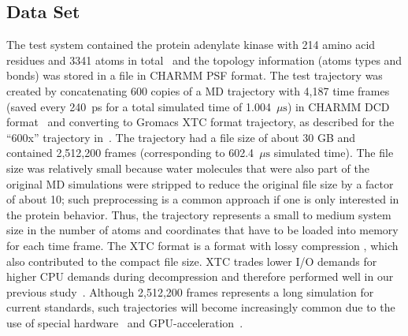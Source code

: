 \subsection{Data Set}
\label{sec:data}

The test system contained the protein adenylate kinase with 214 amino acid residues and 3341 atoms in total~\cite{Seyler:2014il} and the topology information (atoms types and bonds) was stored in a file in CHARMM PSF format.
The test trajectory was created by concatenating 600 copies of a MD trajectory with 4,187 time frames (saved every 240~ps for a total simulated time of 1.004~$\mu\text{s}$) in CHARMM DCD format~\cite{Seyler:2017aa} and converting to Gromacs XTC format trajectory, as described for the ``600x'' trajectory in~\citet{Khoshlessan:2017ab}.
The trajectory had a file size of about 30 GB and contained 2,512,200 frames (corresponding to 602.4~$\mu\text{s}$ simulated time).
The file size was relatively small because water molecules that were also part of the original MD simulations were stripped to reduce the original file size by a factor of about 10; such preprocessing is a common approach if one is only interested in the protein behavior.
Thus, the trajectory represents a small to medium system size in the number of atoms and coordinates that have to be loaded into memory for each time frame.
The XTC format is a format with lossy compression \citep{Lindahl01, Spangberg:2011zr}, which also contributed to the compact file size.
XTC trades lower I/O demands for higher CPU demands during decompression and therefore performed well in our previous study~\citep{Khoshlessan:2017ab}.
Although 2,512,200 frames represents a long simulation for current standards, such trajectories will become increasingly common due to the use of special hardware~\citep{Shaw:2009ly, Shaw:2014aa} and GPU-acceleration~\citep{Salomon-Ferrer:2013cr, Glaser:2015ys, Abraham:2015aa}.
